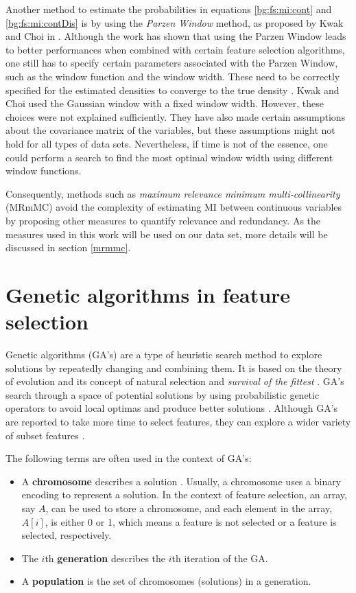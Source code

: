 \documentclass[12pt, twoside, a4paper]{report}
\begin{document}
Another method to estimate the probabilities in equations \ref{bg:fs:mi:cont} and \ref{bg:fs:mi:contDis} is by using the \textit{Parzen Window} method, as proposed by Kwak and Choi in \cite{RefWorks:183}. Although the work has shown that using the Parzen Window leads to better performances when combined with certain feature selection algorithms, one still has to specify certain parameters associated with the Parzen Window, such as the window function and the window width. These need to be correctly specified for the estimated densities to converge to the true density \cite{RefWorks:184}. Kwak and Choi used the Gaussian window with a fixed window width. However, these choices were not explained sufficiently. They have also made certain assumptions about the covariance matrix of the variables, but these assumptions might not hold for all types of data sets. Nevertheless, if time is not of the essence, one could perform a search to find the most optimal window width using different window functions.

Consequently, methods such as \textit{maximum relevance minimum multi-collinearity} (MRmMC) \cite{RefWorks:187} avoid the complexity of estimating MI between continuous variables by proposing other measures to quantify relevance and redundancy. As the measures used in this work will be used on our data set, more details will be discussed in section \ref{mrmmc}.

\section{Genetic algorithms in feature selection} \label{bg:fs:ga}

Genetic algorithms (GA's) are a type of heuristic search method to explore solutions by repeatedly changing and combining them. It is based on the theory of evolution and its concept of natural selection and \textit{survival of the fittest} \cite{RefWorks:205}. GA's search through a space of potential solutions by using probabilistic genetic operators to avoid local optimas and produce better solutions \cite{RefWorks:210, RefWorks:207, RefWorks:211}. Although GA's are reported to take more time to select features, they can explore a wider variety of subset features \cite{RefWorks:232}.

The following terms are often used in the context of GA's:
\begin{itemize}
  \item A \textbf{chromosome} describes a solution \cite{RefWorks:205, RefWorks:209}. Usually, a chromosome uses a binary encoding to represent a solution. In the context of feature selection, an array, say $A$, can be used to store a chromosome, and each element in the array, $A[i]$, is either 0 or 1, which means a feature is not selected or a feature is selected, respectively.
  
  \item The $i$th \textbf{generation} describes the $i$th iteration of the GA.
  
  \item A \textbf{population} is the set of chromosomes (solutions) in a generation.
\end{itemize}
\end{document}
